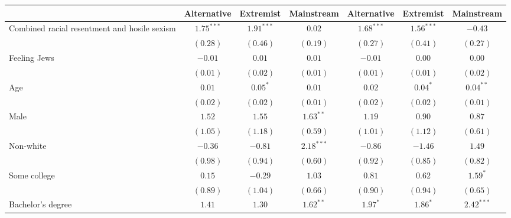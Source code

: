 
\usepackage{booktabs}

\begin{table}
\begin{center}
\begin{tabular}{l c c c c c c}
\toprule
 & Alternative & Extremist & Mainstream & Alternative & Extremist & Mainstream \\
\midrule
Combined racial resentment and hosile sexism & $1.75^{***}$  & $1.91^{***}$   & $0.02$       & $1.68^{***}$  & $1.56^{***}$ & $-0.43$       \\
                                             & $(0.28)$      & $(0.46)$       & $(0.19)$     & $(0.27)$      & $(0.41)$     & $(0.27)$      \\
Feeling Jews                                 & $-0.01$       & $0.01$         & $0.01$       & $-0.01$       & $0.00$       & $0.00$        \\
                                             & $(0.01)$      & $(0.02)$       & $(0.01)$     & $(0.01)$      & $(0.01)$     & $(0.02)$      \\
Age                                          & $0.01$        & $0.05^{*}$     & $0.01$       & $0.02$        & $0.04^{*}$   & $0.04^{**}$   \\
                                             & $(0.02)$      & $(0.02)$       & $(0.01)$     & $(0.02)$      & $(0.02)$     & $(0.01)$      \\
Male                                         & $1.52$        & $1.55$         & $1.63^{**}$  & $1.19$        & $0.90$       & $0.87$        \\
                                             & $(1.05)$      & $(1.18)$       & $(0.59)$     & $(1.01)$      & $(1.12)$     & $(0.61)$      \\
Non-white                                    & $-0.36$       & $-0.81$        & $2.18^{***}$ & $-0.86$       & $-1.46$      & $1.49$        \\
                                             & $(0.98)$      & $(0.94)$       & $(0.60)$     & $(0.92)$      & $(0.85)$     & $(0.82)$      \\
Some college                                 & $0.15$        & $-0.29$        & $1.03$       & $0.81$        & $0.62$       & $1.59^{*}$    \\
                                             & $(0.89)$      & $(1.04)$       & $(0.66)$     & $(0.90)$      & $(0.94)$     & $(0.65)$      \\
Bachelor's degree                            & $1.41$        & $1.30$         & $1.62^{**}$  & $1.97^{*}$    & $1.86^{*}$   & $2.42^{***}$  \\

\end{tabular}
\end{center}
\end{table}
